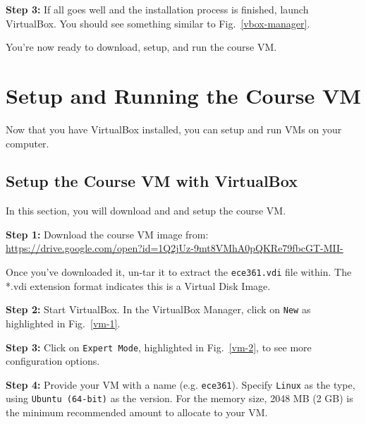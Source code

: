 \documentclass[11pt]{article}
\begin{document}
\textbf{Step 3:} If all goes well and the installation process is finished, launch VirtualBox. You should see something similar to Fig.~\ref{vbox-manager}.

You're now ready to download, setup, and run the course VM.

\section{Setup and Running the Course VM}
\label{sec:setup-run-vm}
Now that you have VirtualBox installed, you can setup and run VMs on your computer. 

\subsection{Setup the Course VM with VirtualBox}
\label{subsec:setup-vm}
In this section, you will download and and setup the course VM.

\textbf{Step 1:} Download the course VM image from:\\
\url{https://drive.google.com/open?id=1Q2jUz-9mt8VMhA0pQKRe79fbcGT-MII-}

\noindent Once you've downloaded it, un-tar it to extract the \texttt{ece361.vdi} file within. The *.vdi extension format indicates this is a Virtual Disk Image.

\textbf{Step 2:} Start VirtualBox. In the VirtualBox Manager, click on \texttt{New} as highlighted in Fig.~\ref{vm-1}.

\textbf{Step 3:} Click on \texttt{Expert Mode}, highlighted in Fig.~\ref{vm-2}, to see more configuration options.

\textbf{Step 4:} Provide your VM with a name (e.g. \texttt{ece361}). Specify \texttt{Linux} as the type, using \texttt{Ubuntu (64-bit)} as the version. For the memory size, 2048 MB (2 GB) is the minimum recommended amount to allocate to your VM.
\end{document}
